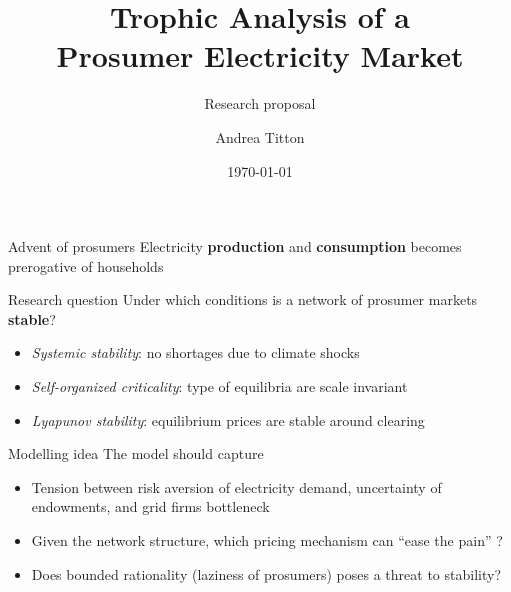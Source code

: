 \documentclass[xcolor={svgnames}]{beamer}
\title[Trophic analysis of Electricity markets]{Trophic Analysis of a\\ Prosumer Electricity Market}
\subtitle{Research proposal}
\author{Andrea Titton}
\institute{Tinbergen Institute}
\date{\today}
\begin{document}
\frame{\titlepage}

\begin{frame}{Advent of prosumers}
    Electricity \textbf{production} and \textbf{consumption} becomes prerogative of households
\end{frame}

\begin{frame}{Research question}
    Under which conditions is a network of prosumer markets \textbf{stable}?

    \begin{itemize} \setlength\itemsep{1em}
        \item \textit{Systemic stability}: no shortages due to climate shocks
        \item \textit{Self-organized criticality}: type of equilibria are scale invariant \nocite{Bak1995}
        \item \textit{Lyapunov stability}: equilibrium prices are stable around clearing
    \end{itemize}
\end{frame}

\begin{frame}{Modelling idea}
    The model should capture
    \begin{itemize}\setlength\itemsep{1em}
        \item Tension between risk aversion of electricity demand, uncertainty of endowments, and grid firms bottleneck
        \item Given the network structure, which pricing mechanism can ``ease the pain'' ?
        \item Does bounded rationality (laziness of prosumers) poses a threat to stability?
    \end{itemize}
\end{frame}
\end{document}
